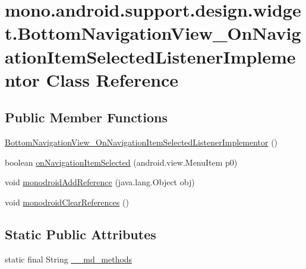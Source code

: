 \hypertarget{classmono_1_1android_1_1support_1_1design_1_1widget_1_1_bottom_navigation_view___on_navigation_ie9d71c6c186664ed279b77f9f21d9a3f}{
\section{mono.android.support.design.widget.BottomNavigationView\_\-OnNavigationItemSelectedListenerImplementor Class Reference}
\label{classmono_1_1android_1_1support_1_1design_1_1widget_1_1_bottom_navigation_view___on_navigation_ie9d71c6c186664ed279b77f9f21d9a3f}
}
\subsection*{Public Member Functions}
\begin{CompactItemize}
\item 
\hyperlink{classmono_1_1android_1_1support_1_1design_1_1widget_1_1_bottom_navigation_view___on_navigation_ie9d71c6c186664ed279b77f9f21d9a3f_df7c34192a6c5d31464cdb4a56828f03}{BottomNavigationView\_\-OnNavigationItemSelectedListenerImplementor} ()
\item 
boolean \hyperlink{classmono_1_1android_1_1support_1_1design_1_1widget_1_1_bottom_navigation_view___on_navigation_ie9d71c6c186664ed279b77f9f21d9a3f_1bb6dccbb265a04710376bed48b9e13c}{onNavigationItemSelected} (android.view.MenuItem p0)
\item 
void \hyperlink{classmono_1_1android_1_1support_1_1design_1_1widget_1_1_bottom_navigation_view___on_navigation_ie9d71c6c186664ed279b77f9f21d9a3f_4c533149ea1e06bd26cd4f6181e94ba9}{monodroidAddReference} (java.lang.Object obj)
\item 
void \hyperlink{classmono_1_1android_1_1support_1_1design_1_1widget_1_1_bottom_navigation_view___on_navigation_ie9d71c6c186664ed279b77f9f21d9a3f_c1245e1801119e2aa7ab0c353ab2a6d9}{monodroidClearReferences} ()
\end{CompactItemize}
\subsection*{Static Public Attributes}
\begin{CompactItemize}
\item 
static final String \hyperlink{classmono_1_1android_1_1support_1_1design_1_1widget_1_1_bottom_navigation_view___on_navigation_ie9d71c6c186664ed279b77f9f21d9a3f_f2f65dc3764a34b31faa520c1b60e1aa}{\_\-\_\-md\_\-methods}
\end{CompactItemize}
